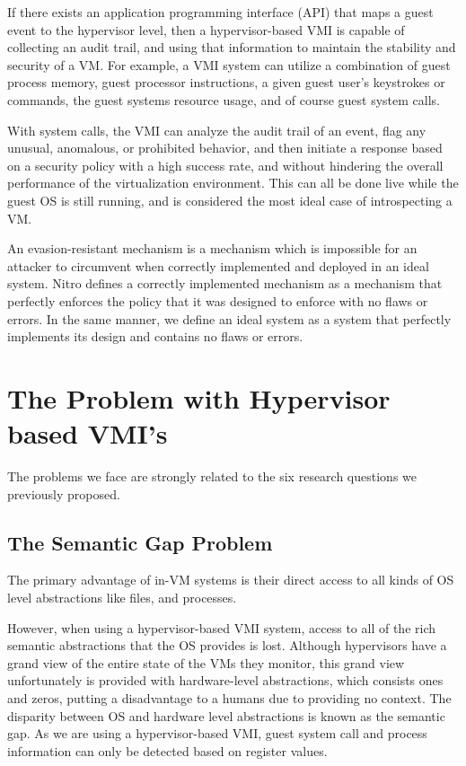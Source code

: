 \documentclass{report}
\begin{document}
\begin{spacing}{1.5}
{\large
If there exists an application programming interface (API) that maps a guest event to the hypervisor level, then a hypervisor-based VMI is capable of collecting an audit trail, and using that information to maintain the stability and security of a VM. For example, a VMI system can utilize a combination of guest process memory, guest processor instructions, a given guest user’s keystrokes or commands, the guest systems resource usage, and of course guest system calls.


With system calls, the VMI can analyze the audit trail of an event, flag any unusual, anomalous, or prohibited behavior, and then initiate a response based on a security policy with a high success rate, and without hindering the overall performance of the virtualization environment. This can all be done live while the guest OS is still running, and is considered the most ideal case of introspecting a VM.






An evasion-resistant mechanism is a mechanism which
is impossible for an attacker to circumvent when correctly implemented and
deployed in an ideal system. Nitro defines a correctly implemented mechanism as a
mechanism that perfectly enforces the policy that it was designed to enforce with
no flaws or errors. In the same manner, we define an ideal system as a system
that perfectly implements its design and contains no flaws or errors.

}




\section{The Problem with Hypervisor based VMI's}

{\large
The problems we face are strongly related to the six research questions we previously proposed.
\newline
}

\subsection{The Semantic Gap Problem}

{\large
The primary advantage of in-VM systems is their direct access to all kinds of OS level abstractions like files, and processes.


However, when using a hypervisor-based VMI system, access to all of the rich semantic abstractions that the OS provides is lost. Although hypervisors have a grand view of the entire state of the VMs they monitor, this grand view unfortunately is provided with hardware-level abstractions, which consists ones and zeros, putting a disadvantage to a humans due to providing no context. The disparity between OS and hardware level abstractions is known as the semantic gap. As we are using a hypervisor-based VMI, guest system call and process information can only be detected based on register values.

}
\end{spacing}
\end{document}
